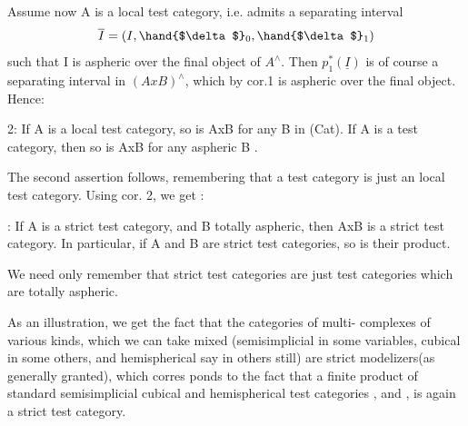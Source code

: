 
Assume now A is a local test category, i.e. admits a separating
interval
\[ \overline{I} = (I,\hand{$\delta$}_0,\hand{$\delta$}_1) \]
such that I is aspheric over the final object of $A^\wedge$. Then $p_1^*(\underline{I})$ is of
course a separating interval in $(AxB)^\wedge$, which by cor.1 is aspheric over
the final object. Hence:

\hand{\uline{\textcolor{black}{Proposition}}} 2: If A is a local test category, so is AxB for any B in
(Cat). If A is a test category, then so is AxB for any aspheric B .

The second assertion follows, remembering that a test category is
just an \hand{\uline{\textcolor{black}{aspheric}}} local test category. Using cor. 2, we get :

: If A is a strict test category, and B totally aspheric,
then AxB is a strict test category. In particular, if A and B are
strict test categories, so is their product.

We need only remember that strict test categories are just test
categories which are totally aspheric.

As an illustration, we get the fact that the categories of multi-%
complexes of various kinds, which we can  take mixed (semisimplicial
in some variables, cubical in some others, and hemispherical say in
others still) are strict modelizers(as generally granted), which corres
\hand{-}ponds to the fact that a  finite product of  standard semisimplicial
cubical and hemispherical test categories \hand{$\Delta$} , \hand{$\Box$} and \hand{\unsure{$\bigcirc$}} , is again a
strict test category.

